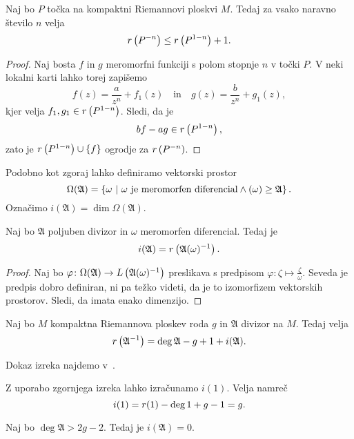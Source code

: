 \begin{trditev}
Naj bo $P$ točka na kompaktni Riemannovi ploskvi $M$. Tedaj za
vsako naravno število $n$ velja
\[
r \left(P^{-n}\right) \leq r \left(P^{1-n}\right) + 1.
\]
\end{trditev}

\begin{proof}
Naj bosta $f$ in $g$ meromorfni funkciji s polom stopnje $n$ v
točki $P$. V neki lokalni karti lahko torej zapišemo
\[
f(z) = \frac{a}{z^n} + f_1(z)
\quad \text{in} \quad
g(z) = \frac{b}{z^n} + g_1(z),
\]
kjer velja $f_1, g_1 \in r \left(P^{1-n}\right)$. Sledi, da je
\[
b f - a g \in r \left(P^{1-n}\right),
\]
zato je $r \left(P^{1-n}\right) \cup \left\{f\right\}$ ogrodje za $r \left(P^{-n}\right)$.
\end{proof}

Podobno kot zgoraj lahko definiramo vektorski prostor
\[
\Omega(\mathfrak{A}) =
\left\{\omega~\middle\vert~\text{$\omega$ je meromorfen diferencial} \land
(\omega) \geq \mathfrak{A}\right\}.
\]
Označimo $i(\mathfrak{A}) = \dim \Omega(\mathfrak{A})$.

\begin{trditev}\label{td:mero_dif}
Naj bo $\mathfrak{A}$ poljuben divizor in $\omega$ meromorfen
diferencial. Tedaj je
\[
i(\mathfrak{A}) = r \left(\mathfrak{A} (\omega)^{-1}\right).
\]
\end{trditev}

\begin{proof}
Naj bo $\varphi \colon
\Omega(\mathfrak{A}) \to L \left(\mathfrak{A} (\omega)^{-1}\right)$
preslikava s predpisom
$\varphi \colon \zeta \mapsto \frac{\zeta}{\omega}$. Seveda je
predpis dobro definiran, ni pa težko videti, da je to izomorfizem
vektorskih prostorov. Sledi, da imata enako dimenzijo.
\end{proof}

\begin{izrek}
Naj bo $M$ kompaktna Riemannova ploskev roda $g$ in $\mathfrak{A}$
divizor na $M$. Tedaj velja
\[
r \left(\mathfrak{A}^{-1}\right) =
\deg \mathfrak{A} - g + 1 + i(\mathfrak{A}).
\]
\end{izrek}

Dokaz izreka najdemo v~\cite[theorem~III.4.11]{Farkas_Kra_1980}.

\begin{zgled}
Z uporabo zgornjega izreka lahko izračunamo $i(1)$. Velja namreč
\[
i(1) = r(1) - \deg 1 + g - 1 = g. \qedhere
\]
\end{zgled}

\begin{trditev}
Naj bo $\deg \mathfrak{A} > 2g - 2$. Tedaj je
$i(\mathfrak{A}) = 0$.
\end{trditev}

